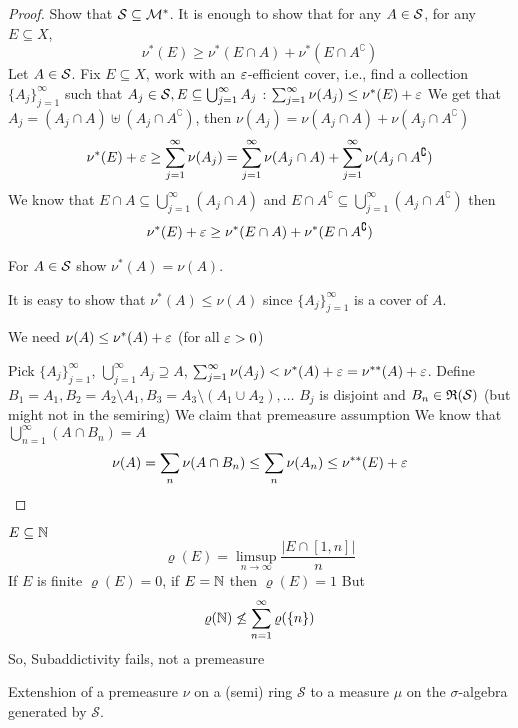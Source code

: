 \begin{proof}
  Show that $\mathcal S \subseteq \mathcal M^*$. It is enough to show that
  for any $A \in \mathcal S$, for any $E \subseteq X$, 
  \[\nu^*(E) \ge \nu^*(E \cap A) + \nu^*(E \cap A^\complement) \]
    Let $A \in \mathcal S$. 
  Fix $E \subseteq X$, work with an $\varepsilon$-efficient cover, i.e.,
  find a collection $\{A_j\}_{j=1}^\infty$ such that $A_j \in \mathcal S, E \subseteq \bigcup_{j=1}^\infty A_j $ : 
  $\sum_{j=1}^\infty \nu(A_j) \le \nu^*(E) + \varepsilon$
  We get that $A_j = (A_j \cap A) \uplus (A_j \cap A^\complement)$, then 
  $\nu(A_j) = \nu(A_j \cap A) + \nu(A_j \cap A^\complement)$
  \[\nu^*(E) + \varepsilon \ge \sum_{j=1}^\infty \nu(A_j) = \sum_{j=1}^\infty \nu(A_j \cap A) + \sum_{j=1}^\infty \nu(A_j \cap A^\complement) \]
  We know that $E \cap A \subseteq \bigcup_{j=1}^\infty (A_j \cap A)$ and $E \cap A^\complement \subseteq \bigcup_{j=1}^\infty (A_j \cap A^\complement)$
  then 
  \begin{align*}
   \nu^*(E) + \varepsilon \ge  \nu^*(E \cap A) + \nu^*(E \cap A^\complement)
  \end{align*}

  For $A \in \mathcal S$ show $\nu^*(A) = \nu(A)$.

  It is easy to show that $\nu^*(A) \le \nu(A)$ since $\{A_j\}_{j=1}^\infty$ is a cover of $A$.

  We need $\nu(A) \le \nu^*(A) + \varepsilon$ (for all $\varepsilon > 0$)

  Pick $\{A_j\}_{j=1}^\infty$, $\bigcup_{j=1}^\infty A_j \supseteq A$, $\sum_{j=1}^\infty \nu(A_j) < \nu^*(A) + \varepsilon = \nu^{**}(A) + \varepsilon$.
  Define $B_1 = A_1, B_2 = A_2 \setminus A_1, B_3 = A_3 \setminus (A_1 \cup A_2), \dotsc$ $B_j$ is disjoint and $B_n \in \mathfrak R(\mathcal S)$ (but might not in the semiring)
  We claim that premeasure assumption
  We know that $\bigcup_{n=1}^\infty (A \cap B_n) = A$
  \[\nu(A) = \sum_n \nu(A\cap B_n) \le \sum_n \nu(A_n) \le \nu^{**}(E) + \varepsilon\]
\end{proof}

\begin{example}
  $E \subseteq \mathbb N$ 
  \[\varrho(E) = \limsup_{n\to\infty} \frac{|E \cap [1, n]|}n\]
  If $E$ is finite $\varrho(E) = 0$, if $E = \mathbb N$ then $\varrho(E) = 1$
  But 
  \[\varrho(\mathbb N) \not\le \sum_{n=1}^\infty \varrho(\{n\})\]
  So, Subaddictivity fails, not a premeasure
\end{example}

Extenshion of a premeasure $\nu$ on a (semi) ring $\mathcal{S}$
to a measure $\mu$ on the $\sigma$-algebra generated by $\mathcal{S}$.

